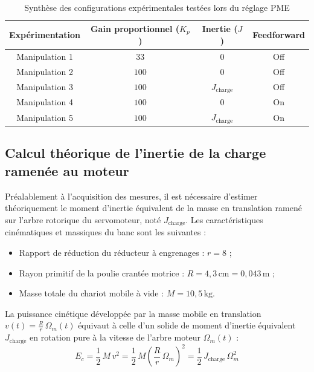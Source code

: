 \documentclass[12pt,a4paper]{article}
\begin{document}
\begin{table}[H]
\centering
\begin{tabular}{cccc}
\toprule
\textbf{Expérimentation} & \textbf{Gain proportionnel ($K_p$)} & \textbf{Inertie ($J$)} & \textbf{Feedforward} \\
\midrule
Manipulation 1 & $33$  & $0$                     & Off \\
Manipulation 2 & $100$ & $0$                     & Off \\
Manipulation 3 & $100$ & $J_{\text{charge}}$     & Off \\
Manipulation 4 & $100$ & $0$                     & On  \\
Manipulation 5 & $100$ & $J_{\text{charge}}$     & On  \\
\bottomrule
\end{tabular}
\caption{Synthèse des configurations expérimentales testées lors du réglage PME}
\label{tab:manipulations}
\end{table}

\clearpage

\subsection{Calcul théorique de l'inertie de la charge ramenée au moteur}

Préalablement à l'acquisition des mesures, il est nécessaire d'estimer théoriquement le moment d'inertie équivalent de la masse en translation ramené sur l'arbre rotorique du servomoteur, noté $J_{\text{charge}}$. Les caractéristiques cinématiques et massiques du banc sont les suivantes :
\begin{itemize}
    \item Rapport de réduction du réducteur à engrenages : $r = 8$ ;
    \item Rayon primitif de la poulie crantée motrice : $R = 4{,}3\,\text{cm} = 0{,}043\,\text{m}$ ;
    \item Masse totale du chariot mobile à vide : $M = 10{,}5\,\text{kg}$.
\end{itemize}

La puissance cinétique développée par la masse mobile en translation $v(t) = \frac{R}{r}\,\Omega_m(t)$ équivaut à celle d'un solide de moment d'inertie équivalent $J_{\text{charge}}$ en rotation pure à la vitesse de l'arbre moteur $\Omega_m(t)$ :
\begin{equation}
E_c = \frac{1}{2} \, M \, v^2 = \frac{1}{2} \, M \left(\frac{R}{r} \, \Omega_m\right)^2 = \frac{1}{2} \, J_{\text{charge}} \, \Omega_m^2
\end{equation}
\end{document}
